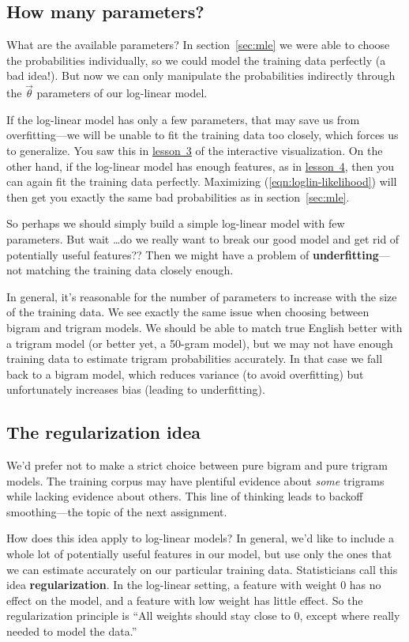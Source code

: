 \documentclass[11pt]{article}
\newcommand{\vtheta}{\vec{\theta}}
\newcommand{\lesson}[1]{\href{http://cs.jhu.edu/~jason/tutorials/loglin/\##1}{lesson~#1}}
\begin{document}
\subsection{How many parameters?}

What are the available parameters?  In section~\ref{sec:mle} we were
able to choose the probabilities individually, so we could model the
training data perfectly (a bad idea!).  But now we can only manipulate
the probabilities indirectly through the $\vtheta$ parameters of our
log-linear model.

If the log-linear model has only a few parameters, that may save us
from overfitting---we will be unable to fit the training data too
closely, which forces us to generalize.  You saw this in \lesson{3} of
the interactive visualization.  On the other hand, if the log-linear
model has enough features, as in \lesson{4}, then you can again fit the
training data perfectly.  Maximizing (\ref{eqn:loglin-likelihood})
will then get you exactly the same bad probabilities as in
section~\ref{sec:mle}.

So perhaps we should simply build a simple log-linear model with few
parameters.  But wait \ldots do we really want to break our good model
and get rid of potentially useful features??  Then we might have a
problem of {\bf underfitting}---not matching the training data closely
enough.

In general, it's reasonable for the number of parameters to increase
with the size of the training data.  We see exactly the same issue
when choosing between bigram and trigram models.  We should be able to
match true English better with a trigram model (or better yet, a
50-gram model), but we may not have enough training data to estimate
trigram probabilities accurately.  In that case we fall back to a
bigram model, which reduces variance (to avoid overfitting) but
unfortunately increases bias (leading to underfitting).

\subsection{The regularization idea}

We'd prefer not to make a strict choice between pure bigram and
pure trigram models.  The training corpus may have plentiful evidence
about {\em some} trigrams while lacking evidence about others.  This
line of thinking leads to backoff smoothing---the topic of the next
assignment.

How does this idea apply to log-linear models?  In general, we'd like
to include a whole lot of potentially useful features in our model,
but use only the ones that we can estimate accurately on our
particular training data.  Statisticians call this idea {\bf
  regularization}.  In the log-linear setting, a feature with weight 0
has no effect on the model, and a feature with low weight has little
effect.  So the regularization principle is ``All weights should stay
close to 0, except where really needed to model the data.''
\end{document}
